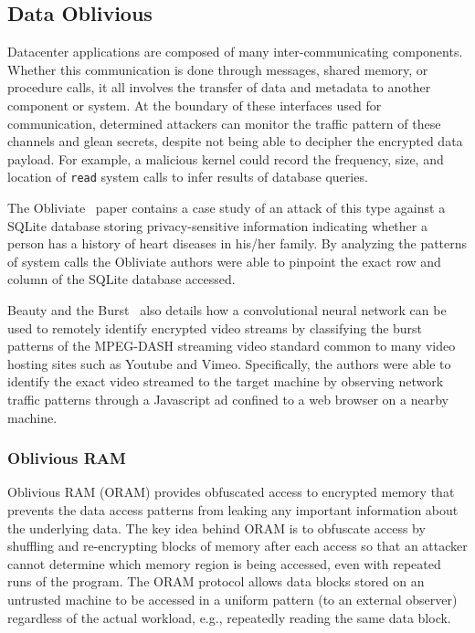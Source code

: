 \documentclass[letterpaper,twocolumn,10pt]{article}
\begin{document}
\subsection{Data Oblivious}
Datacenter applications are composed of many inter-communicating components.
Whether this communication is done through messages, shared memory, or
procedure calls, it all involves the transfer of data and metadata to another
component or system. At the boundary of these interfaces used for
communication, determined attackers can monitor the traffic pattern of these
channels and glean secrets, despite not being able to decipher the encrypted
data payload.  For example, a malicious kernel could record the frequency,
size, and location of \verb|read| system calls to infer results of database
queries.

The Obliviate~\cite{noauthor_obliviate:_nodate} paper contains a case study of
an attack of this type against a SQLite database storing privacy-sensitive
information indicating whether a person has a history of heart diseases in
his/her family. By analyzing the patterns of system calls the Obliviate authors
were able to pinpoint the exact row and column of the SQLite database accessed.

Beauty and the Burst~\cite{schuster_beauty_2017} also details how a
convolutional neural network can be used to remotely identify encrypted video
streams by classifying the burst patterns of the MPEG-DASH streaming video
standard common to many video hosting sites such as Youtube and Vimeo.
Specifically, the authors were able to identify the exact video streamed to the
target machine by observing network traffic patterns through a Javascript ad
confined to a web browser on a nearby machine.

\subsubsection{Oblivious RAM}
Oblivious RAM (ORAM) provides obfuscated access to encrypted memory that
prevents the data access patterns from leaking any important information about
the underlying data. The key idea behind ORAM is to obfuscate access by
shuffling and re-encrypting blocks of memory after each access so that an
attacker cannot determine which memory region is being accessed, even with
repeated runs of the program. The ORAM protocol allows data blocks stored
on an untrusted machine to be accessed in a uniform pattern (to an external
observer) regardless of the actual workload, e.g., repeatedly reading the same
data block.
\end{document}
